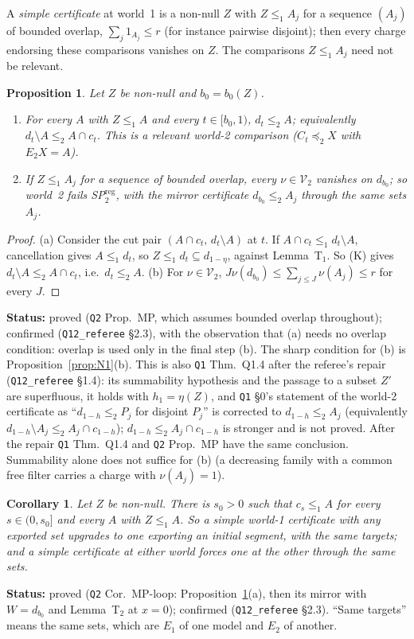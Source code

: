 \documentclass[11pt]{article}
\newtheorem{proposition}[theorem]{Proposition}
\newtheorem{corollary}[theorem]{Corollary}
\theoremstyle{definition}
\theoremstyle{remark}
\newcommand{\src}[1]{\texttt{#1}}
\newcommand{\status}[1]{\par\smallskip\noindent\textbf{Status:} #1\par\smallskip}
\begin{document}
A \emph{simple certificate} at world~1 is a non-null $Z$ with $Z\le_1A_j$ for a sequence $(A_j)$ of bounded overlap, $\sum_j1_{A_j}\le r$ (for instance pairwise disjoint); then every charge endorsing these comparisons vanishes on $Z$. The comparisons $Z\le_1A_j$ need not be relevant.

\begin{proposition}\label{prop:MP}
Let $Z$ be non-null and $b_0=b_0(Z)$.
\begin{enumerate}[leftmargin=*,label=(\alph*)]
\item For every $A$ with $Z\le_1A$ and every $t\in[b_0,1)$, $d_t\le_2A$; equivalently $d_t\setminus A\le_2A\cap c_t$. This is a relevant world-2 comparison ($C_t\preceq_2X$ with $E_2X=A$).
\item If $Z\le_1A_j$ for a sequence of bounded overlap, every $\nu\in\mathcal V_2$ vanishes on $d_{b_0}$; so world~2 fails SP$^{\mathrm{reg}}_2$, with the mirror certificate $d_{b_0}\le_2A_j$ through the same sets $A_j$.
\end{enumerate}
\end{proposition}
\begin{proof}
(a) Consider the cut pair $(A\cap c_t,\,d_t\setminus A)$ at $t$. If $A\cap c_t\le_1d_t\setminus A$, cancellation gives $A\le_1d_t$, so $Z\le_1d_t\subseteq d_{1-\eta}$, against Lemma~T$_1$. So (K) gives $d_t\setminus A\le_2A\cap c_t$, i.e.\ $d_t\le_2A$. (b) For $\nu\in\mathcal V_2$, $J\nu(d_{b_0})\le\sum_{j\le J}\nu(A_j)\le r$ for every $J$.
\end{proof}
\status{proved (\src{Q2} Prop.~MP, which assumes bounded overlap throughout); confirmed (\src{Q12\_referee} \S2.3), with the observation that (a) needs no overlap condition: overlap is used only in the final step (b). The sharp condition for (b) is Proposition~\ref{prop:N1}(b). This is also \src{Q1} Thm.~Q1.4 after the referee's repair (\src{Q12\_referee} \S1.4): its summability hypothesis and the passage to a subset $Z'$ are superfluous, it holds with $h_1=\eta(Z)$, and \src{Q1} \S0's statement of the world-2 certificate as ``$d_{1-h}\le_2P_j$ for disjoint $P_j$'' is corrected to $d_{1-h}\le_2A_j$ (equivalently $d_{1-h}\setminus A_j\le_2A_j\cap c_{1-h}$); $d_{1-h}\le_2A_j\cap c_{1-h}$ is stronger and is not proved. After the repair \src{Q1} Thm.~Q1.4 and \src{Q2} Prop.~MP have the same conclusion. Summability alone does not suffice for (b) (a decreasing family with a common free filter carries a charge with $\nu(A_j)=1$).}

\begin{corollary}\label{cor:MPloop}
Let $Z$ be non-null. There is $s_0>0$ such that $c_s\le_1A$ for every $s\in(0,s_0]$ and every $A$ with $Z\le_1A$. So a simple world-1 certificate with any exported set upgrades to one exporting an initial segment, with the same targets; and a simple certificate at either world forces one at the other through the same sets.
\end{corollary}
\status{proved (\src{Q2} Cor.~MP-loop: Proposition~\ref{prop:MP}(a), then its mirror with $W=d_{b_0}$ and Lemma~T$_2$ at $x=0$); confirmed (\src{Q12\_referee} \S2.3). ``Same targets'' means the same sets, which are $E_1$ of one model and $E_2$ of another.}
\end{document}
